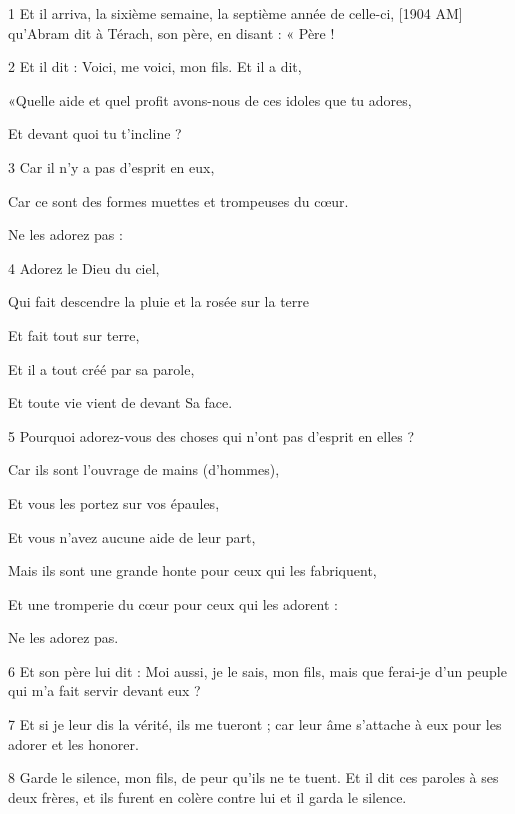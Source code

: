 \par 1 Et il arriva, la sixième semaine, la septième année de celle-ci, [1904 AM] qu'Abram dit à Térach, son père, en disant : « Père !
\par 2 Et il dit : Voici, me voici, mon fils. Et il a dit,
\par    
\par     «Quelle aide et quel profit avons-nous de ces idoles que tu adores,  
\par     Et devant quoi tu t'incline ?
\par    
\par 3 Car il n'y a pas d'esprit en eux,  
\par     Car ce sont des formes muettes et trompeuses du cœur.  
\par     Ne les adorez pas :
\par    
\par 4 Adorez le Dieu du ciel,  
\par     Qui fait descendre la pluie et la rosée sur la terre  
\par     Et fait tout sur terre,
\par    
\par     Et il a tout créé par sa parole,  
\par     Et toute vie vient de devant Sa face.
\par    
\par 5 Pourquoi adorez-vous des choses qui n'ont pas d'esprit en elles ?  
\par     Car ils sont l'ouvrage de mains (d'hommes),
\par    
\par     Et vous les portez sur vos épaules,  
\par     Et vous n'avez aucune aide de leur part,
\par    
\par     Mais ils sont une grande honte pour ceux qui les fabriquent,  
\par     Et une tromperie du cœur pour ceux qui les adorent :  
\par     Ne les adorez pas.
\par    
\par 6 Et son père lui dit : Moi aussi, je le sais, mon fils, mais que ferai-je d'un peuple qui m'a fait servir devant eux ?
\par 7 Et si je leur dis la vérité, ils me tueront ; car leur âme s'attache à eux pour les adorer et les honorer.
\par 8 Garde le silence, mon fils, de peur qu'ils ne te tuent. Et il dit ces paroles à ses deux frères, et ils furent en colère contre lui et il garda le silence.
